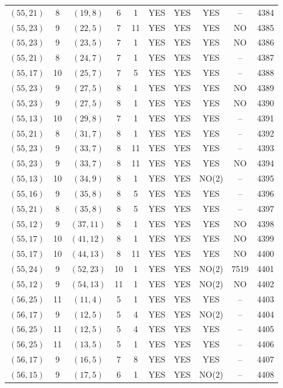 \begin{longtable}{|c|c|c|c|c|c|c|c|c|c|}
$(55, 21)$ & 8 & $(19, 8)$ & 6 & 1 & YES & YES & YES & -- & 4384\\
$(55, 23)$ & 9 & $(22, 5)$ & 7 & 11 & YES & YES & YES & NO & 4385\\
$(55, 23)$ & 9 & $(23, 5)$ & 7 & 1 & YES & YES & YES & NO & 4386\\
$(55, 21)$ & 8 & $(24, 7)$ & 7 & 1 & YES & YES & YES & -- & 4387\\
$(55, 17)$ & 10 & $(25, 7)$ & 7 & 5 & YES & YES & YES & -- & 4388\\
$(55, 23)$ & 9 & $(27, 5)$ & 8 & 1 & YES & YES & YES & NO & 4389\\
$(55, 23)$ & 9 & $(27, 5)$ & 8 & 1 & YES & YES & YES & NO & 4390\\
$(55, 13)$ & 10 & $(29, 8)$ & 7 & 1 & YES & YES & YES & -- & 4391\\
$(55, 21)$ & 8 & $(31, 7)$ & 8 & 1 & YES & YES & YES & -- & 4392\\
$(55, 23)$ & 9 & $(33, 7)$ & 8 & 11 & YES & YES & YES & -- & 4393\\
$(55, 23)$ & 9 & $(33, 7)$ & 8 & 11 & YES & YES & YES & NO & 4394\\
$(55, 13)$ & 10 & $(34, 9)$ & 8 & 1 & YES & YES & NO(2) & -- & 4395\\
$(55, 16)$ & 9 & $(35, 8)$ & 8 & 5 & YES & YES & YES & -- & 4396\\
$(55, 21)$ & 8 & $(35, 8)$ & 8 & 5 & YES & YES & YES & -- & 4397\\
$(55, 12)$ & 9 & $(37, 11)$ & 8 & 1 & YES & YES & YES & NO & 4398\\
$(55, 17)$ & 10 & $(41, 12)$ & 8 & 1 & YES & YES & YES & NO & 4399\\
$(55, 17)$ & 10 & $(44, 13)$ & 8 & 11 & YES & YES & YES & NO & 4400\\
$(55, 24)$ & 9 & $(52, 23)$ & 10 & 1 & YES & YES & NO(2) & 7519 & 4401\\
$(55, 12)$ & 9 & $(54, 13)$ & 11 & 1 & YES & YES & NO(2) & NO & 4402\\
$(56, 25)$ & 11 & $(11, 4)$ & 5 & 1 & YES & YES & YES & -- & 4403\\
$(56, 17)$ & 9 & $(12, 5)$ & 5 & 4 & YES & YES & NO(2) & -- & 4404\\
$(56, 25)$ & 11 & $(12, 5)$ & 5 & 4 & YES & YES & YES & -- & 4405\\
$(56, 25)$ & 11 & $(13, 5)$ & 5 & 1 & YES & YES & YES & -- & 4406\\
$(56, 17)$ & 9 & $(16, 5)$ & 7 & 8 & YES & YES & YES & -- & 4407\\
$(56, 15)$ & 9 & $(17, 5)$ & 6 & 1 & YES & YES & NO(2) & -- & 4408\\

\end{longtable}
